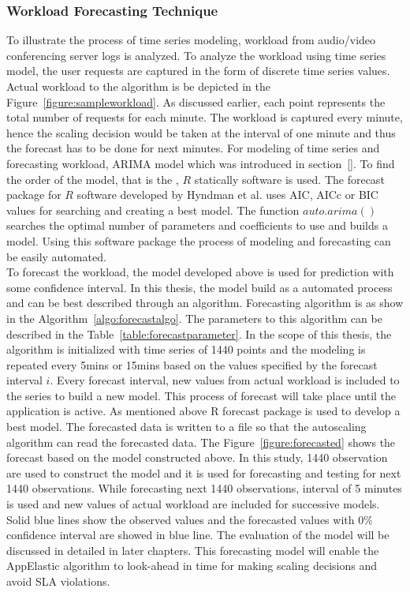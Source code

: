 \subsubsection{Workload Forecasting Technique}
\label{subs:Workload Forecasting Technique}
To illustrate the process of time series modeling, workload from audio/video conferencing server logs is analyzed. To analyze the workload using time series model, the user requests are captured in the form of discrete time series values. Actual workload to the algorithm is be depicted in the Figure~\ref{figure:sampleworkload}. As discussed earlier, each point represents the total number of requests for each minute. The workload is captured every minute, hence the scaling decision would be taken at the interval of one minute and thus the forecast has to be done for next minutes. For  modeling of time series and forecasting workload, ARIMA model which was introduced in section~\ref{}.
To find the order of the model, that is the , \(R\) statically software is used. The forecast package for \(R\) software developed by Hyndman et al.\cite{hyndman2007automatic} uses AIC, AICc or BIC values\cite{hyndman2007automatic} for searching and creating a best model. The function \(auto.arima()\) searches the optimal number of parameters and coefficients to use and builds a model. Using this software package the process of modeling and forecasting can be easily automated.
\\
To forecast the workload, the model developed above is used for prediction with some confidence interval. In this thesis, the model build as a automated process and can be best described through an algorithm. Forecasting algorithm is as show in the Algorithm~\ref{algo:forecastalgo}. The parameters to this algorithm can be described in the Table~\ref{table:forecastparameter}. In the scope of this thesis, the algorithm is initialized with time series of 1440 points and the modeling is repeated every 5mins or 15mins based on the values specified by the forecast interval \(i\). Every forecast interval, new values from actual workload is included to the series to build a new model. This process of forecast will take place until the application is active. As mentioned above R forecast package is used to develop a best model. The forecasted data is written to a file so that the autoscaling algorithm can read the forecasted data. The Figure~\ref{figure:forecasted}  shows the forecast based on the model constructed above. In this study, 1440 observation are used to construct the model and it is used for forecasting and testing for next 1440 observations. While forecasting next 1440 observations,  interval of 5 minutes is used and new values of actual workload are included for successive models. Solid blue lines show the observed values and the forecasted values with 0\% confidence interval are showed in blue line. The evaluation of the model will be discussed in detailed in later chapters. This forecasting model will enable the AppElastic algorithm to look-ahead in time for making scaling decisions and avoid SLA violations.

